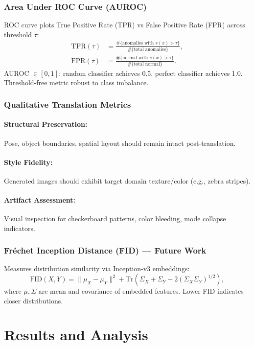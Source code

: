 \documentclass[conference]{IEEEtran}
\begin{document}
\subsubsection{Area Under ROC Curve (AUROC)}
ROC curve plots True Positive Rate (TPR) vs False Positive Rate (FPR) across threshold $\tau$:
\begin{align}
\text{TPR}(\tau) &= \frac{\#\{\text{anomalies with } s(x) > \tau\}}{\#\{\text{total anomalies}\}}, \\
\text{FPR}(\tau) &= \frac{\#\{\text{normal with } s(x) > \tau\}}{\#\{\text{total normal}\}}.
\end{align}
AUROC $\in [0,1]$; random classifier achieves 0.5, perfect classifier achieves 1.0. Threshold-free metric robust to class imbalance.

\subsubsection{Qualitative Translation Metrics}
\paragraph{Structural Preservation:} Pose, object boundaries, spatial layout should remain intact post-translation.
\paragraph{Style Fidelity:} Generated images should exhibit target domain texture/color (e.g., zebra stripes).
\paragraph{Artifact Assessment:} Visual inspection for checkerboard patterns, color bleeding, mode collapse indicators.

\subsubsection{Fréchet Inception Distance (FID) — Future Work}
Measures distribution similarity via Inception-v3 embeddings:
\begin{equation}
\text{FID}(X, Y) = \|\mu_X - \mu_Y\|^2 + \text{Tr}(\Sigma_X + \Sigma_Y - 2(\Sigma_X \Sigma_Y)^{1/2}),
\end{equation}
where $\mu, \Sigma$ are mean and covariance of embedded features. Lower FID indicates closer distributions.

\section{Results and Analysis}
\end{document}
